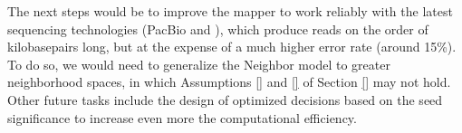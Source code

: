 The next steps would be to improve the mapper to work reliably with
the latest sequencing technologies (PacBio and ), which produce reads
on the order of kilobasepairs long, but at the expense of a much
higher error rate (around 15\%). To do so, we would need to generalize
the Neighbor model to greater neighborhood spaces, in which Assumptions
\ref{} and \ref{} of Section \ref{} may not hold. Other future tasks
include the design of optimized decisions based on the seed
significance to increase even more the computational efficiency.
